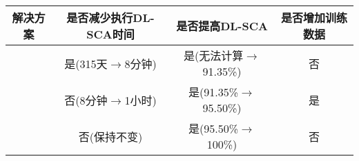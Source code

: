 {{{		\begin{table}[!h]
			\label{tab:solution2problem}
			\centering
			\tiny
			\begin{tabular}{c|ccc}
				\hline
				解决方案&是否减少执行DL-SCA时间&是否提高DL-SCA\zyx &是否增加训练数据\\
				\hline
				\yuchuli&是(315天$\rightarrow$8分钟)&是(无法计算$\rightarrow$91.35\%)&否\\
				\shujuzengqiang&否(8分钟$\rightarrow$1小时)&是(91.35\%$\rightarrow$95.50\%)&是\\
				\jiashejianyanguji&否(保持不变)&是(95.50\%$\rightarrow$100\%)&否\\
				\hline
			\end{tabular}
		\end{table}
		
	}
{

}}}
